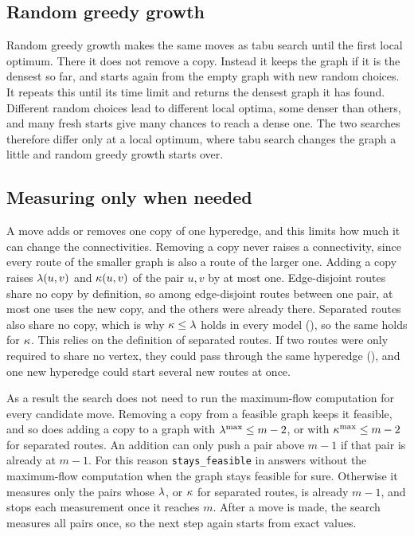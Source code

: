 

\subsection{Random greedy growth}

Random greedy growth makes the same moves as tabu search until the first local optimum.
There it does not remove a copy. Instead it keeps the graph if it is the densest so far, and starts again from the empty graph with new random choices.
It repeats this until its time limit and returns the densest graph it has found.
Different random choices lead to different local optima, some denser than others, and many fresh starts give many chances to reach a dense one.
The two searches therefore differ only at a local optimum, where tabu search changes the graph a little and random greedy growth starts over.


\subsection{Measuring only when needed}\label{sec:near-cap}
A move adds or removes one copy of one hyperedge, and this limits how much it can change the connectivities.
Removing a copy never raises a connectivity, since every route of the smaller graph is also a route of the larger one.
Adding a copy raises $\lambda(u,v)$ and $\kappa(u,v)$ of the pair $u,v$ by at most one. 
Edge-disjoint routes share no copy by definition, so among edge-disjoint routes between one pair, at most one uses the new copy, and the others were already there.
Separated routes also share no copy, which is why $\kappa\le\lambda$ holds in every model (), so the same holds for $\kappa$.
This relies on the definition of separated routes. If two routes were only required to share no vertex, they could pass through the same hyperedge (), and one new hyperedge could start several new routes at once.

As a result the search does not need to run the maximum-flow computation for every candidate move.
Removing a copy from a feasible graph keeps it feasible, and so does adding a copy to a graph with $\lambda^{\max}\le m-2$, or with $\kappa^{\max}\le m-2$ for separated routes.
An addition can only push a pair above $m-1$ if that pair is already at $m-1$.
For this reason \texttt{stays\_feasible} in  answers without the maximum-flow computation when the graph stays feasible for sure.
Otherwise it measures only the pairs whose $\lambda$, or $\kappa$ for separated routes, is already $m-1$, and stops each measurement once it reaches $m$.
After a move is made, the search measures all pairs once, so the next step again starts from exact values.

